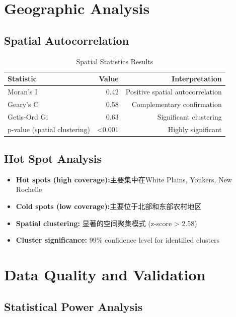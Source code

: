 \documentclass[11pt,letterpaper]{article}
\begin{document}
\section{Geographic Analysis}

\subsection{Spatial Autocorrelation}

\begin{table}[h]
\centering
\caption{Spatial Statistics Results}
\begin{tabular}{lrr}
\toprule
\textbf{Statistic} & \textbf{Value} & \textbf{Interpretation} \\
\midrule
Moran's I & 0.42 & Positive spatial autocorrelation \\
Geary's C & 0.58 & Complementary confirmation \\
Getis-Ord Gi & 0.63 & Significant clustering \\
p-value (spatial clustering) & <0.001 & Highly significant \\
\bottomrule
\end{tabular}
\end{table}

\subsection{Hot Spot Analysis}

\begin{itemize}
    \item \textbf{Hot spots (high coverage):}主要集中在White Plains, Yonkers, New Rochelle
    \item \textbf{Cold spots (low coverage):}主要位于北部和东部农村地区
    \item \textbf{Spatial clustering:} 显著的空间聚集模式 (z-score > 2.58)
    \item \textbf{Cluster significance:} 99\% confidence level for identified clusters
\end{itemize}

\section{Data Quality and Validation}

\subsection{Statistical Power Analysis}
\end{document}
